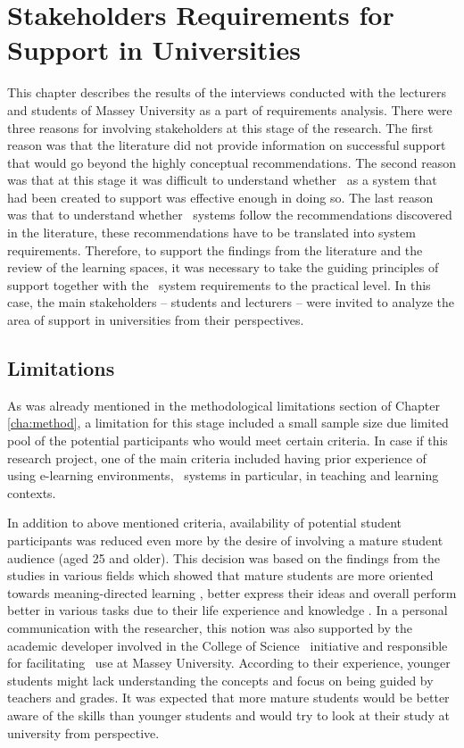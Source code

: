 \chapter{Stakeholders Requirements for \LLLc Support in Universities
\label{cha:model}}
This chapter describes the results of the interviews conducted with the
lecturers and students of Massey University as a part of \LLLs requirements
analysis. There were three reasons for involving stakeholders at this stage of
the research. The first reason was that the literature did not provide information
on successful \LLLs support that would go beyond the highly conceptual
recommendations. The second reason was that at this stage it was difficult to
understand whether \ep~as a system that had been created to support \LLLs was
effective enough in doing so. The last reason was that to understand whether
\ep~systems follow the recommendations discovered in the literature, these
recommendations have to be translated into system requirements. Therefore, to
support the findings from the literature and the review of the learning spaces,
it was necessary to take the guiding principles of \LLLs support together with
the \ep~system requirements to the practical level. In this case, the main
stakeholders -- students and lecturers -- were invited to analyze the area of
\LLLs support in universities from their perspectives.

\section{Limitations}

As was already mentioned in the methodological limitations section of Chapter
\ref{cha:method}, a limitation for this stage included a small sample size due
limited pool of the potential participants who would meet certain criteria. In
case if this research project, one of the main criteria included having prior
experience of using e-learning environments, \ep~systems in particular, in
teaching and learning contexts.

In addition to above mentioned criteria, availability of potential student
participants was reduced even more by the desire of involving a mature student
audience (aged 25 and older). This decision was based on the findings from the
studies in various fields which showed that mature students are more oriented
towards meaning-directed learning \citep{Smith2010}, better express their ideas
\citep{Lea2010} and overall perform better in various tasks due to their life
experience and knowledge \citep{Sherwood1987}. In a personal communication with
the researcher, this notion was also supported by the academic developer
involved in the College of Science \ep~initiative and responsible for
facilitating \ep~use at Massey University. According to their experience,
younger students might lack understanding the \LLLs concepts and focus on being
guided by teachers and grades. It was expected that more mature students would
be better aware of the \LLLs skills than younger students and would try to look
at their study at university from \LLLs perspective.

